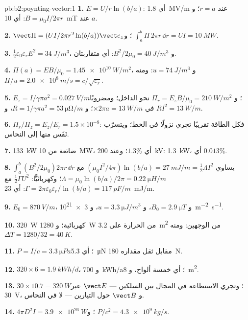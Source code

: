 \begin{solution}{pb:b2:poynting-vector:1}
\textbf{1.} $E = U/r\ln(b/a)$: أي \qty{1.8}{MV/m} عند $r = a$؛ و $B = \mu_0I/2\pi r$:
أي \qty{10}{mT} عند $a$.

\textbf{2.} $\vect\Pi = (UI/2\pi r^2\ln(b/a))\vect e_z$؛ و $\int_a^b\Pi\,2\pi r\,\dd r = UI =
\qty{10}{MW}$.

\textbf{3.} $\tfrac12\varepsilon_0\varepsilon_rE^2 = \qty{34}{J/m^3}$، و $B^2/2\mu_0 = \qty{40}{J/m^3}$:
أي متقاربتان.

\textbf{4.} $\Pi(a) = EB/\mu_0 = \qty{1.45e10}{W/m^2}$، و $u = \qty{74}{J/m^3}$: ومنه $\Pi/u =
\qty{2.0e8}{m/s} = c/\sqrt{\varepsilon_r}$.

\textbf{5.} $E_z = I/\gamma\pi a^2 = \qty{0.027}{V/m}$؛ و $\Pi_r = E_zB/\mu_0 = \qty{210}{W/m^2}$
نحو الداخل؛ ومضروبًا في $\times2\pi a = \qty{13}{W/m}$؛ و $R = 1/\gamma\pi a^2 = \qty{53}{\micro\ohm/m}$، و $RI^2 =
\qty{13}{W/m}$.

\textbf{6.} $\Pi_r/\Pi_z = E_z/E_r = 1.5 \times 10^{-8}$: فكل الطاقة تقريبًا تجري
نزولًا في الخط؛ ويتسرّب نَفَس منها إلى النحاس.

\textbf{7.} \qty{133}{kW} ضائعة من \qty{10}{MW}، أي $1.3\%$؛ وعند \qty{200}{kV}: \qty{1.3}{kW}،
أي $0.013\%$.

\textbf{8.} $\int_a^b(B^2/2\mu_0)2\pi r\,\dd r$ يساوي $(\mu_0I^2/4\pi)\ln(b/a) = \qty{27}{mJ/m} =
\tfrac12\Lambda I^2$ مع $\Lambda = \mu_0\ln(b/a)/2\pi = \qty{0.22}{\micro H/m}$؛ وكهربائيًّا:
$\tfrac12\Gamma U^2$ مع $\Gamma = 2\pi\varepsilon_0\varepsilon_r/\ln(b/a) = \qty{117}{pF/m}$: أي \qty{23}{mJ/m}.

\textbf{9.} $E_0 = \qty{870}{V/m}$، و $B_0 = \qty{2.9}{\micro T}$، و $u = \qty{3.3}{\micro J/m^3}$،
و \qty{3e21}{m^{-2}.s^{-1}}.

\textbf{10.} \qty{320}{W} كهربائية؛ و \qty{1280}{W} من الحرارة على \qty{3.2}{m^2} من
الوجهين: ومنه $\Delta T = 1280/32 = \qty{40}{K}$.

\textbf{11.} $P = I/c = \qty{3.3}{\micro Pa}$؛ أي \qty{5.3}{\micro N} مقابل ثقل مقداره
\qty{180}{N}.

\textbf{12.} $320 \times 6 = \qty{1.9}{kWh/d}$، و \qty{700}{kWh/a}؛ أي خمسة ألواح،
و \qty{8}{m^2}.

\textbf{13.} $30 \times 10.7 = \qty{320}{W}$؛ وتجري الاستطاعة في المجال بين
السلكين --- $\vect E$ عبر \qty{30}{V}، و $\vect B$ حول التيارين ---
لا في النحاس.

\textbf{14.} $4\pi D^2I = \qty{3.9e26}{W}$؛ و $P/c^2 = \qty{4.3e9}{kg/s}$.


\end{solution}
